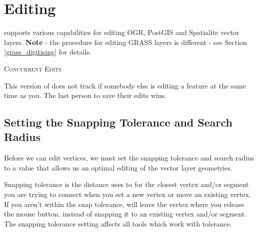 \section{Editing}

\qg supports various capabilities for editing OGR, PostGIS and Spatialite 
vector layers. \textbf{Note} - the procedure for editing GRASS layers is 
different - see Section \ref{grass_digitising} for details.

\begin{Tip}\caption{\textsc{Concurrent Edits}}
This version of \qg does not track if somebody else is editing a
feature at the same time as you. The last person to save their edits wins.
\end{Tip}

\subsection{Setting the Snapping Tolerance and Search Radius}\label{snapping_tolerance}

Before we can edit vertices, we must set the snapping
tolerance and search radius to a value that allows us an optimal editing of
the vector layer geometries. 


Snapping tolerance is the distance \qg uses to  for the
closest vertex and/or segment you are trying to
connect when you set a new vertex or move an existing vertex. If you aren't
within the snap tolerance, \qg will leave the vertex where you release the
mouse button, instead of snapping it to an existing vertex and/or segment. 
The snapping tolerance setting affects all tools which work with tolerance. 

